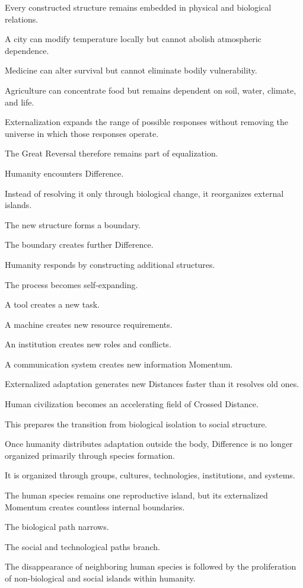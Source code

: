 Every constructed structure remains embedded in physical and biological relations.

A city can modify temperature locally but cannot abolish atmospheric dependence.

Medicine can alter survival but cannot eliminate bodily vulnerability.

Agriculture can concentrate food but remains dependent on soil, water, climate, and life.

Externalization expands the range of possible responses without removing the universe in which those responses operate.

The Great Reversal therefore remains part of equalization.

Humanity encounters Difference.

Instead of resolving it only through biological change, it reorganizes external islands.

The new structure forms a boundary.

The boundary creates further Difference.

Humanity responds by constructing additional structures.

The process becomes self-expanding.

A tool creates a new task.

A machine creates new resource requirements.

An institution creates new roles and conflicts.

A communication system creates new information Momentum.

Externalized adaptation generates new Distances faster than it resolves old ones.

Human civilization becomes an accelerating field of Crossed Distance.

This prepares the transition from biological isolation to social structure.

Once humanity distributes adaptation outside the body, Difference is no longer organized primarily through species formation.

It is organized through groups, cultures, technologies, institutions, and systems.

The human species remains one reproductive island, but its externalized Momentum creates countless internal boundaries.

The biological path narrows.

The social and technological paths branch.

The disappearance of neighboring human species is followed by the proliferation of non-biological and social islands within humanity.

